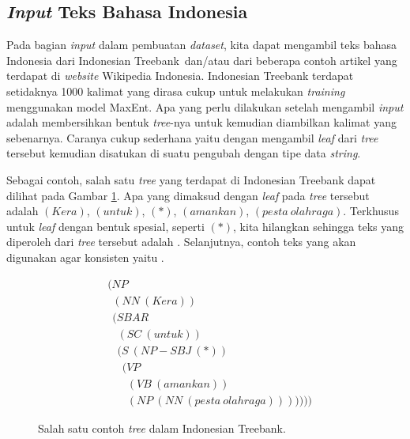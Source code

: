 \subsection{\textit{Input} Teks Bahasa Indonesia}

Pada bagian \textit{input} dalam pembuatan \textit{dataset}, kita dapat mengambil teks bahasa Indonesia
dari Indonesian Treebank\footnotemark[1]\ dan/atau dari beberapa contoh artikel yang terdapat di
\textit{website} Wikipedia Indonesia\footnotemark[2].
Indonesian Treebank terdapat setidaknya 1000 kalimat yang dirasa cukup untuk melakukan
\textit{training} menggunakan model MaxEnt.
Apa yang perlu dilakukan setelah mengambil \textit{input} adalah membersihkan bentuk \textit{tree}-nya
untuk kemudian diambilkan kalimat yang sebenarnya.
Caranya cukup sederhana yaitu dengan mengambil \textit{leaf} dari \textit{tree} tersebut kemudian
disatukan di suatu pengubah dengan tipe data \textit{string}.

Sebagai contoh, salah satu \textit{tree} yang terdapat di Indonesian Treebank dapat dilihat pada
Gambar \ref{treebank:tree:1}.
Apa yang dimaksud dengan \textit{leaf} pada \textit{tree} tersebut adalah $(Kera)$, $(untuk)$,
$(*)$, $(amankan)$, $(pesta\ olahraga)$.
Terkhusus untuk \textit{leaf} dengan bentuk spesial, seperti $(*)$, kita hilangkan sehingga teks
yang diperoleh dari \textit{tree} tersebut adalah .
Selanjutnya, contoh teks yang akan digunakan agar konsisten yaitu
.


\begin{figure}\centering\small
	\begin{align*}
		&(NP\\
		&\ \ (NN\ (Kera))\\
		&\ \ (SBAR\\
		&\ \ \ \ (SC\ (untuk))\\
		&\ \ \ \ (S\ (NP-SBJ\ (*))\\
		&\ \ \ \ \ \ (VP\\
		&\ \ \ \ \ \ \ \ (VB\ (amankan))\\
		&\ \ \ \ \ \ \ \ (NP\ (NN\ (pesta\ olahraga)))))))
	\end{align*}
	\caption{Salah satu contoh \textit{tree} dalam Indonesian Treebank.}
	\label{treebank:tree:1}
\end{figure}


